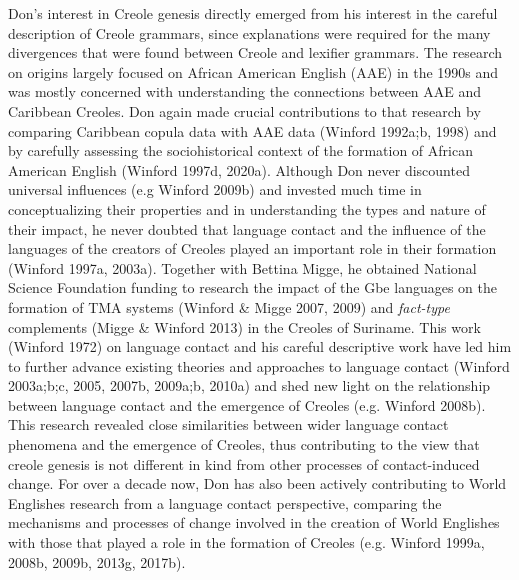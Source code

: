 \documentclass[output=paper, colorlinks,citecolor=brown]{langscibook}
\begin{document}
\begin{sloppypar}
Don’s interest in Creole genesis directly emerged from his interest in the careful description of Creole grammars, since explanations were required for the many divergences that were found between Creole and lexifier grammars. The research on origins largely focused on African American English (AAE) in the 1990s and was mostly concerned with understanding the connections between AAE and Caribbean Creoles. Don again made crucial contributions to that research by comparing Caribbean copula data with AAE data (Winford 1992a;b, 1998) and by carefully assessing the sociohistorical context of the formation of African American English (Winford 1997d, 2020a). Although Don never discounted universal influences (e.g Winford 2009b) and invested much time in conceptualizing their properties and in understanding the types and nature of their impact, he never doubted that language contact and the influence of the languages of the creators of Creoles played an important role in their formation (Winford 1997a, 2003a). Together with Bettina Migge, he obtained National Science Foundation funding to research the impact of the Gbe languages on the formation of TMA systems (Winford \& Migge 2007, 2009) and \textit{fact-type} complements (Migge \& Winford 2013) in the Creoles of Suriname. This work (Winford 1972) on language contact and his careful descriptive work have led him to further advance existing theories and approaches to language contact (Winford 2003a;b;c, 2005, 2007b, 2009a;b, 2010a) and shed new light on the relationship between language contact and the emergence of Creoles (e.g. Winford 2008b). This research revealed close similarities between wider language contact phenomena and the emergence of Creoles, thus contributing to the view that creole genesis is not different in kind from other processes of contact-induced change. For over a decade now, Don has also been actively contributing to World Englishes research from a language contact perspective, comparing the mechanisms and processes of change involved in the creation of World Englishes with those that played a role in the formation of Creoles (e.g. Winford 1999a, 2008b, 2009b, 2013g, 2017b).
\end{sloppypar}
\end{document}
